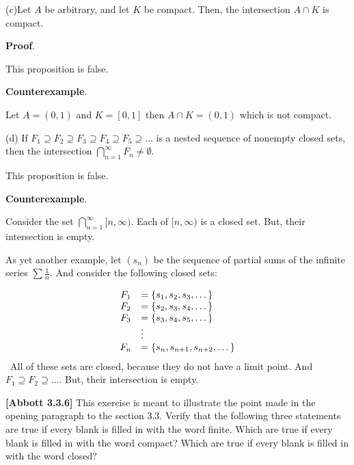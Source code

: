 \documentclass[10pt]{article}
\begin{document}
(c)Let $\displaystyle A$ be arbitrary, and let $\displaystyle K$ be compact. Then, the intersection $\displaystyle A\cap K$ is compact.



\textbf{Proof}.



This proposition is false.



\textbf{Counterexample}.



Let $\displaystyle A=( 0,1)$ and $\displaystyle K=[ 0,1]$ then $\displaystyle A\cap K=( 0,1)$ which is not compact.



(d) If $\displaystyle F_{1} \supseteq F_{2} \supseteq F_{3} \supseteq F_{4} \supseteq F_{5} \supseteq \dotsc $ is a nested sequence of nonempty closed sets, then the intersection $\displaystyle \bigcap _{n=1}^{\infty } F_{n} \neq \emptyset $.

This proposition is false.



\textbf{Counterexample}.



Consider the set $\displaystyle \bigcap _{n=1}^{\infty }[ n,\infty )$. Each of $\displaystyle [ n,\infty )$ is a closed set. But, their intersection is empty.



As yet another example, let $\displaystyle ( s_{n})$ be the sequence of partial sums of the infinite series $\displaystyle \sum \frac{1}{n}$. And consider the following closed sets:


\begin{equation*}
\begin{array}{ c l }
F_{1} & =\{s_{1} ,s_{2} ,s_{3} ,\dotsc \}\\
F_{2} & =\{s_{2} ,s_{3} ,s_{4} ,\dotsc \}\\
F_{3} & =\{s_{3} ,s_{4} ,s_{5} ,\dotsc \}\\
 & \vdots \\
F_{n} & =\{s_{n} ,s_{n+1} ,s_{n+2} ,\dotsc \}
\end{array}
\end{equation*}
 \ All of these sets are closed, because they do not have a limit point. And $\displaystyle F_{1} \supseteq F_{2} \supseteq \dotsc $. But, their intersection is empty.



\textbf{[Abbott 3.3.6] }This exercise is meant to illustrate the point made in the opening paragraph to the section 3.3. Verify that the following three statements are true if every blank is filled in with the word finite. Which are true if every blank is filled in with the word compact? Which are true if every blank is filled in with the word closed?
\end{document}
